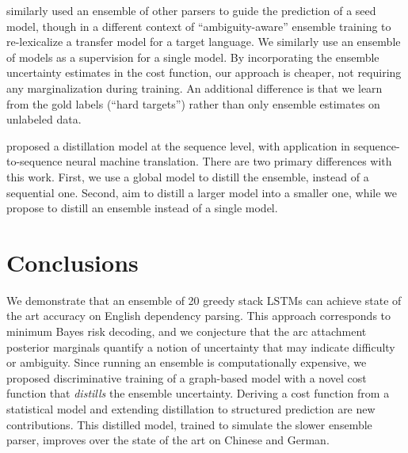 \documentclass[11pt,letterpaper]{article}
\newcommand{\ignore}[1]{}
\newcommand{\adhicomment}[1]{\ignore{\textcolor{green}{{\textbf{[#1 --\textsc{adhi}]}}}}}
\begin{document}
 similarly used an ensemble of other parsers to guide the prediction of a seed model, though in a different context of ``ambiguity-aware'' ensemble training to re-lexicalize a transfer model for a target language. We similarly use an ensemble of models as a supervision for a single model.  By incorporating the ensemble uncertainty estimates in the cost function, our approach is cheaper, not requiring any marginalization during training. An additional difference is that we learn from the gold labels (``hard targets'') rather than only ensemble estimates on unlabeled data. 

 proposed a distillation model at the sequence level, with application in sequence-to-sequence neural machine translation. There are two primary differences with this work. First, we use a global model to distill the ensemble, instead of a sequential one. Second,  aim to distill a larger model into a smaller one, while we propose to distill an ensemble instead of a single model.\adhicomment{Added new EMNLP paper from Sasha Rush's group}




\section{Conclusions}
We demonstrate that an ensemble of 20 greedy stack LSTMs \cite{stack_lstm} can achieve state of the art accuracy on English dependency parsing.
This approach corresponds to minimum Bayes risk decoding, and we conjecture that the arc attachment posterior marginals quantify a notion of uncertainty that may indicate difficulty or ambiguity.
Since running an ensemble is computationally expensive, we proposed discriminative training of a graph-based model with a novel cost function that \emph{distills} the ensemble uncertainty.   Deriving a cost function from a statistical model and extending distillation to structured prediction are new contributions.  This distilled model, trained to simulate the slower ensemble parser, improves over the state of the art on Chinese and German.
\end{document}

